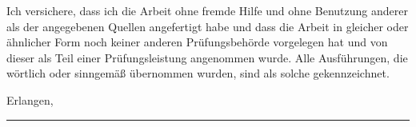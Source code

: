 



Ich versichere, dass ich die Arbeit ohne fremde Hilfe und ohne Benutzung anderer als der angegebenen Quellen angefertigt habe und dass die Arbeit in gleicher oder {\"a}hnlicher Form noch keiner anderen Pr{\"u}fungsbeh{\"o}rde vorgelegen hat und von dieser als Teil einer Pr{\"u}fungsleistung angenommen wurde. Alle Ausf{\"u}hrungen, die w{\"o}rtlich oder sinngem{\"a}ß {\"u}bernommen wurden, sind als solche gekennzeichnet.

\vspace{1.5cm}

Erlangen, \myTime
\vspace{1.5cm}

\rule{4cm}{0.2mm}
\newline
\myName
\vfill
\newpage

